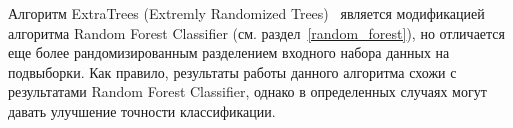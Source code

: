 Алгоритм ExtraTrees (Extremly Randomized Trees)~\cite{extra_trees} является модификацией 
алгоритма Random Forest Classifier (см. раздел~\ref{random_forest}), но отличается еще более рандомизированным
разделением входного набора данных на подвыборки. Как правило, результаты работы данного алгоритма
схожи с результатами Random Forest Classifier, однако в определенных случаях могут давать улучшение
точности классификации.

